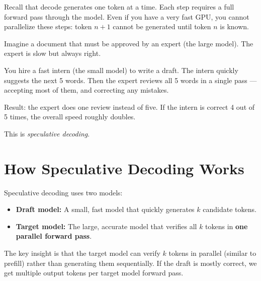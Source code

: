 \documentclass[10pt, oneside, openany]{book}
\newcommand{\analogybox}[2]{\begin{tcolorbox}[analogystyle, title={Analogy: #1}]#2\end{tcolorbox}}
\begin{document}
Recall that decode generates one token at a time.  Each step requires a full
forward pass through the model.  Even if you have a very fast GPU, you cannot
parallelize these steps: token $n+1$ cannot be generated until token $n$ is known.

\analogybox{The Draft and Reviewer}{
Imagine a document that must be approved by an expert (the large model).
The expert is slow but always right.

You hire a fast intern (the small model) to write a draft.  The intern quickly
suggests the next 5 words.  Then the expert reviews all 5 words in a single pass
--- accepting most of them, and correcting any mistakes.

Result: the expert does one review instead of five.  If the intern is correct
4 out of 5 times, the overall speed roughly doubles.

This is \textit{speculative decoding}.
}

\section{How Speculative Decoding Works}

Speculative decoding uses two models:

\begin{itemize}
  \item \textbf{Draft model:} A small, fast model that quickly generates $k$
        candidate tokens.
  \item \textbf{Target model:} The large, accurate model that verifies all $k$
        tokens in \textbf{one parallel forward pass}.
\end{itemize}

The key insight is that the target model can verify $k$ tokens in parallel
(similar to prefill) rather than generating them sequentially.  If the draft is
mostly correct, we get multiple output tokens per target model forward pass.
\end{document}
